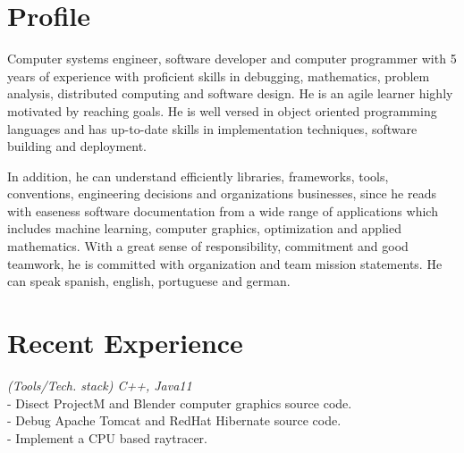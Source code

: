 \documentclass[]{CV-JuanCamiloFlorez}
\begin{document}
\begin{minipage}[t]{0.66\textwidth} 


\section{Profile}
\parindent=20pt Computer systems engineer, software developer and computer programmer with 5 years of experience with proficient skills in debugging, mathematics, problem analysis, distributed computing and software design. He is an agile learner highly motivated by reaching goals. He is well versed in object oriented programming languages and has up-to-date skills in implementation techniques, software building and deployment.

\parindent=20pt In addition, he can understand efficiently libraries, frameworks, tools, conventions, engineering decisions and organizations businesses, since he reads with easeness software documentation from a wide range of applications which includes machine learning, computer graphics, optimization and applied mathematics. With a great sense of responsibility, commitment and good teamwork, he is committed with organization and team mission statements. He can speak spanish, english, portuguese and german.

\sectionsep

\section{Recent Experience}
    \noindent
    \textit{(Tools/Tech. stack) C++, Java11} \\
        - Disect ProjectM and Blender computer graphics source code. \\
        - Debug Apache Tomcat and RedHat Hibernate source code. \\
        - Implement a CPU based raytracer. \\
        \sectionsep


\end{minipage}
\end{document}
